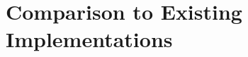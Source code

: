 \documentclass{article}
\begin{document}
\section{Comparison to Existing Implementations}



\end{document}
